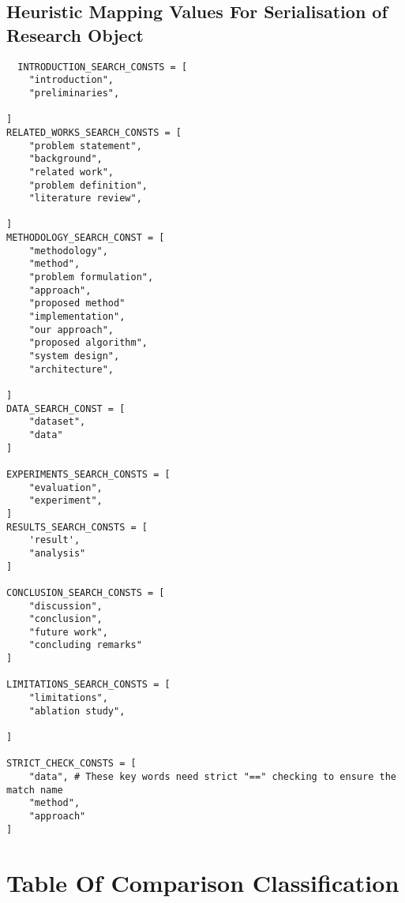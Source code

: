 \section{Heuristic Mapping Values For Serialisation of Research Object}
\label{appendix:mapping-heuristic}
\begin{lstlisting}
  INTRODUCTION_SEARCH_CONSTS = [
    "introduction",
    "preliminaries",
    
]
RELATED_WORKS_SEARCH_CONSTS = [
    "problem statement",
    "background",
    "related work",
    "problem definition",
    "literature review",

]
METHODOLOGY_SEARCH_CONST = [
    "methodology",
    "method",
    "problem formulation",
    "approach",
    "proposed method"
    "implementation",
    "our approach",
    "proposed algorithm",
    "system design",
    "architecture",

]
DATA_SEARCH_CONST = [
    "dataset",
    "data"
]

EXPERIMENTS_SEARCH_CONSTS = [
    "evaluation",
    "experiment",
]
RESULTS_SEARCH_CONSTS = [
    'result',
    "analysis"
]

CONCLUSION_SEARCH_CONSTS = [
    "discussion",
    "conclusion",
    "future work",
    "concluding remarks"
]

LIMITATIONS_SEARCH_CONSTS = [
    "limitations",
    "ablation study",

]

STRICT_CHECK_CONSTS = [
    "data", # These key words need strict "==" checking to ensure the match name
    "method",
    "approach"
]
\end{lstlisting}

\chapter{Table Of Comparison Classification}
\label{appendix:toc}

